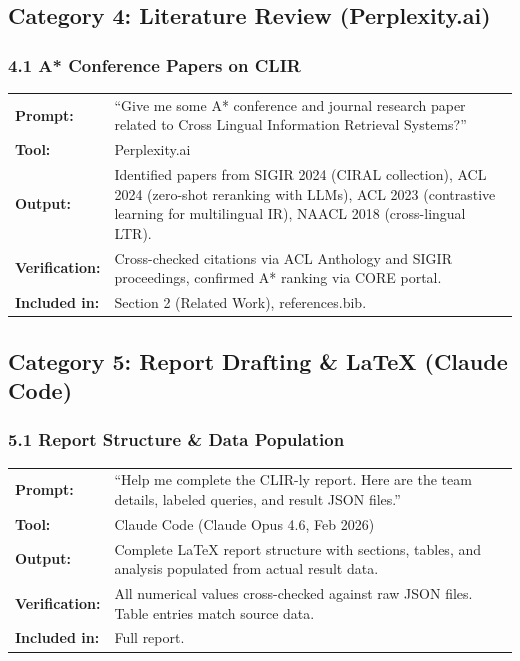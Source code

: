\documentclass[12pt,a4paper]{article}
\begin{document}
\subsection*{Category 4: Literature Review (Perplexity.ai)}

\subsubsection*{4.1 A* Conference Papers on CLIR}
\begin{tabular}{p{3.2cm}p{9.5cm}}
\textbf{Prompt:}        & ``Give me some A* conference and journal research paper related to Cross Lingual Information Retrieval Systems?'' \\
\textbf{Tool:}          & Perplexity.ai \\
\textbf{Output:}        & Identified papers from SIGIR 2024 (CIRAL collection), ACL 2024 (zero-shot reranking with LLMs), ACL 2023 (contrastive learning for multilingual IR), NAACL 2018 (cross-lingual LTR). \\
\textbf{Verification:}  & Cross-checked citations via ACL Anthology and SIGIR proceedings, confirmed A* ranking via CORE portal. \\
\textbf{Included in:}   & Section 2 (Related Work), references.bib. \\
\end{tabular}

\subsection*{Category 5: Report Drafting \& LaTeX (Claude Code)}

\subsubsection*{5.1 Report Structure \& Data Population}
\begin{tabular}{p{3.2cm}p{9.5cm}}
\textbf{Prompt:}        & ``Help me complete the CLIR-ly report. Here are the team details, labeled queries, and result JSON files.'' \\
\textbf{Tool:}          & Claude Code (Claude Opus 4.6, Feb 2026) \\
\textbf{Output:}        & Complete LaTeX report structure with sections, tables, and analysis populated from actual result data. \\
\textbf{Verification:}  & All numerical values cross-checked against raw JSON files. Table entries match source data. \\
\textbf{Included in:}   & Full report. \\
\end{tabular}
\end{document}
